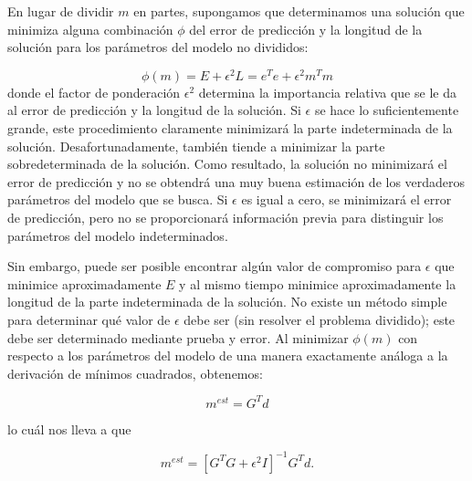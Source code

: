 \documentclass[aspectratio=169]{beamer}
\begin{document}
\begin{frame}

{\color{black}
 En lugar de dividir $m$ en partes, supongamos que determinamos una solución que minimiza alguna combinación $\phi$ del error de predicción y la longitud de la solución para los parámetros del modelo no divididos:
 
 \begin{equation}
  \phi(m) = E + \epsilon^2 L = e^Te + \epsilon^2 m^Tm
 \end{equation}
donde el factor de ponderación $\epsilon^2$ determina la importancia relativa que se le da al error de predicción y la longitud de la solución. Si $\epsilon$ se hace lo suficientemente grande, este procedimiento claramente minimizará la parte indeterminada de la solución. Desafortunadamente, también tiende a minimizar la parte sobredeterminada de la solución. Como resultado, la solución no minimizará el error de predicción y no se obtendrá una muy buena estimación de los verdaderos parámetros del modelo que se busca. Si $\epsilon$ es igual a cero, se minimizará el error de predicción, pero no se proporcionará información previa para distinguir los parámetros del modelo indeterminados. 
}

\end{frame}


\begin{frame}

{\color{black}
 Sin embargo, puede ser posible encontrar algún valor de compromiso para $\epsilon$ que minimice aproximadamente $E$ y al mismo tiempo minimice aproximadamente la longitud de la parte indeterminada de la solución. No existe un método simple para determinar qué valor de $\epsilon$ debe ser (sin resolver el problema dividido); este debe ser determinado mediante prueba y error. Al minimizar $\phi(m)$ con respecto a los parámetros del modelo de una manera exactamente análoga a la derivación de mínimos cuadrados, obtenemos:

\begin{equation}
 [G^TG + \epsilon^2 I] m^{est} = G^T d
\end{equation}

lo cuál nos lleva a que

\begin{equation}
 m^{est} = [G^TG + \epsilon^2 I]^{-1} G^T d.
\end{equation}
}
 
\end{frame}
\end{document}
